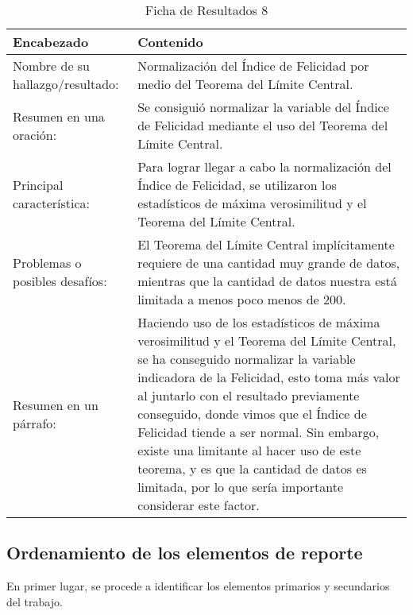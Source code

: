 \begin{table}[H]
    \caption{Ficha de Resultados 8}
    \begin{center}
        \begin{tabular}{  m{3cm} | m{12cm}  }
        \hline
        \textbf{ Encabezado} & \textbf{Contenido }\\ 
        \hline
        Nombre de su hallazgo/resultado: & Normalización del Índice de Felicidad por medio del Teorema del Límite Central. \\ 
        \hline
        Resumen en una oración: & Se consiguió normalizar la variable del Índice de Felicidad mediante el uso del Teorema del Límite Central.\\ 
        \hline
        Principal característica: & Para lograr llegar a cabo la normalización del Índice de Felicidad, se utilizaron los estadísticos de máxima verosimilitud y el Teorema del Límite Central.\\ 
        \hline
        Problemas o posibles desafíos: &  El Teorema del Límite Central implícitamente requiere de una cantidad muy grande de datos, mientras que la cantidad de datos nuestra está limitada a menos poco menos de 200.\\ 
        \hline
        Resumen en un párrafo: & Haciendo uso de los estadísticos de máxima verosimilitud y el Teorema del Límite Central, se ha conseguido normalizar la variable indicadora de la Felicidad, esto toma más valor al juntarlo con el resultado previamente conseguido, donde vimos que el Índice de Felicidad tiende a ser normal. Sin embargo, existe una limitante al hacer uso de este teorema, y es que la cantidad de datos es limitada, por lo que sería importante considerar este factor.\\ 
        \hline
        \end{tabular}
    \end{center}
\end{table}
\newpage

\subsection{Ordenamiento de los elementos de reporte}

En primer lugar, se procede a identificar los elementos primarios y secundarios del trabajo.

